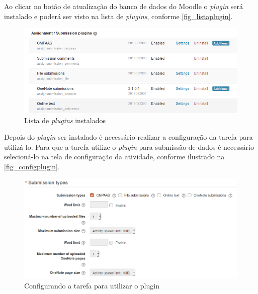 \documentclass[
	12pt,				%
	openright,			%
	oneside,			%
	a4paper,			%
	english,			%
	french,				%
	spanish,			%
	brazil				%
	]{abntex2}
\begin{document}
Ao clicar no botão de atualização do banco de dados do Moodle o \textit{plugin} será instalado e poderá ser visto na lista de \textit{plugins}, conforme \autoref{fig_listaplugin}.

\begin{figure}[htb]
	\caption{\label{fig_listaplugin} Lista de \textit{plugins} instalados}
	\begin{center}
		\includegraphics[scale=0.4]{listaplugin.png}
	\end{center}
\end{figure}

Depois do \textit{plugin} ser instalado é necessário realizar a configuração da tarefa para utilizá-lo. Para que a tarefa utilize o \textit{plugin} para submissão de dados é necessário selecioná-lo na tela de configuração da atividade, conforme ilustrado na \autoref{fig_configplugin}.

\begin{figure}[htb]
	\caption{\label{fig_configplugin} Configurando a tarefa para utilizar o plugin}
	\begin{center}
		\includegraphics[scale=0.4]{configplugin.png}
	\end{center}
\end{figure}
\end{document}
